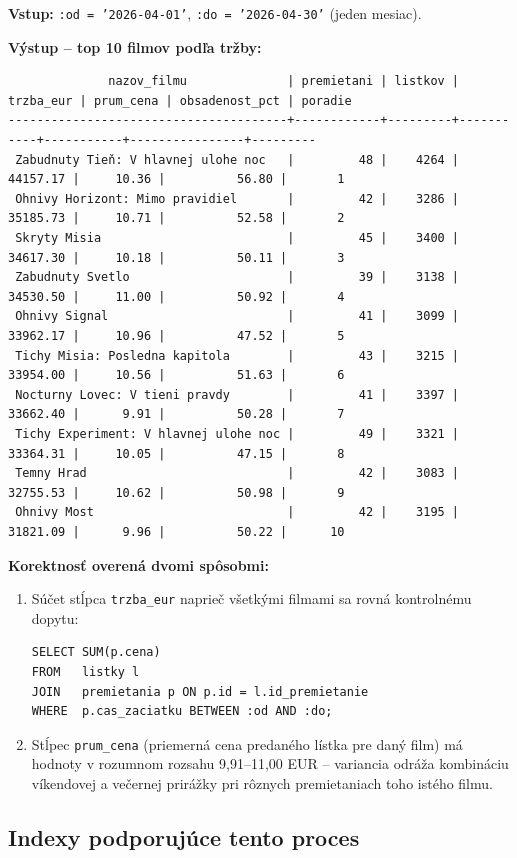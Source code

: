 \documentclass[11pt, a4paper]{article}
\begin{document}
\textbf{Vstup:} \texttt{:od = '2026-04-01'}, \texttt{:do = '2026-04-30'}
(jeden mesiac).

\textbf{Výstup -- top 10 filmov podľa tržby:}
{\scriptsize
\begin{verbatim}
              nazov_filmu              | premietani | listkov | trzba_eur | prum_cena | obsadenost_pct | poradie
---------------------------------------+------------+---------+-----------+-----------+----------------+---------
 Zabudnuty Tieň: V hlavnej ulohe noc   |         48 |    4264 |  44157.17 |     10.36 |          56.80 |       1
 Ohnivy Horizont: Mimo pravidiel       |         42 |    3286 |  35185.73 |     10.71 |          52.58 |       2
 Skryty Misia                          |         45 |    3400 |  34617.30 |     10.18 |          50.11 |       3
 Zabudnuty Svetlo                      |         39 |    3138 |  34530.50 |     11.00 |          50.92 |       4
 Ohnivy Signal                         |         41 |    3099 |  33962.17 |     10.96 |          47.52 |       5
 Tichy Misia: Posledna kapitola        |         43 |    3215 |  33954.00 |     10.56 |          51.63 |       6
 Nocturny Lovec: V tieni pravdy        |         41 |    3397 |  33662.40 |      9.91 |          50.28 |       7
 Tichy Experiment: V hlavnej ulohe noc |         49 |    3321 |  33364.31 |     10.05 |          47.15 |       8
 Temny Hrad                            |         42 |    3083 |  32755.53 |     10.62 |          50.98 |       9
 Ohnivy Most                           |         42 |    3195 |  31821.09 |      9.96 |          50.22 |      10
\end{verbatim}
}

\textbf{Korektnosť overená dvomi spôsobmi:}
\begin{enumerate}
    \item Súčet stĺpca \texttt{trzba\_eur} naprieč všetkými filmami sa
    rovná kontrolnému dopytu:
\begin{lstlisting}
SELECT SUM(p.cena)
FROM   listky l
JOIN   premietania p ON p.id = l.id_premietanie
WHERE  p.cas_zaciatku BETWEEN :od AND :do;
\end{lstlisting}
    \item Stĺpec \texttt{prum\_cena} (priemerná cena predaného lístka pre
    daný film) má hodnoty v rozumnom rozsahu 9,91--11,00 EUR -- variancia
    odráža kombináciu víkendovej a večernej prirážky pri rôznych
    premietaniach toho istého filmu.
\end{enumerate}

\subsection{Indexy podporujúce tento proces}
\end{document}

